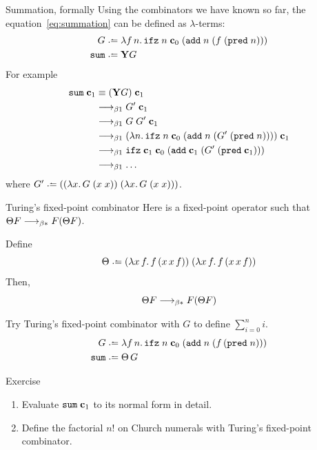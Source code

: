 \begin{frame}{Summation, formally}
  Using the combinators we have known so far, the equation~\eqref{eq:summation}
  can be defined as $\lambda$-terms:
  \begin{align*}
    G \defeq{} & 
    \lambda f\,n.\, \mathtt{ifz}\;n\;\bc_0\;
    (\add\;n\;(f\;(\mathtt{pred}\;n))) \\
    \mathtt{sum} \defeq{} & \mathbf{Y}G
  \end{align*}
  For example
  \begin{align*}
    \mathtt{sum}\;\mathbf{c}_1
      &\equiv  (\mathbf{Y}G)\;\mathbf{c}_1 \\
      &\longrightarrow_{\beta1} G'\;\mathbf{c}_1 \\
      &\longrightarrow_{\beta1} G\;G'\;\mathbf{c}_1 \\
      &\longrightarrow_{\beta1} (\lambda n.\, \mathtt{ifz}\;n\;\mathbf{c}_0\;
      (\mathtt{add}\;n\;(G'\;(\mathtt{pred}\;n))))\;\mathbf{c}_1 \\
      &\longrightarrow_{\beta1} \mathtt{ifz}\;\mathbf{c}_1\;\mathbf{c}_0\;
      (\mathtt{add}\;\mathbf{c}_1\;(G'\;(\mathtt{pred}\;\mathbf{c}_1))) \\
      &\longrightarrow_{\beta1} \dots
  \end{align*}
  where
  $G' \defeq ((\lambda x.\, G\;(x\;x))\;(\lambda x.\,G\;(x\;x)))$.
\end{frame}
  
\begin{frame}{Turing's fixed-point combinator}
Here is a fixed-point operator such that $\Theta F \longrightarrow_{\beta*} F(\Theta F)$.
\begin{proposition}
  Define 
  \[
    \Theta \defeq 
    (\lambda x\,f.\,f\,(x\,x\,f))\;
    (\lambda x\,f.\,f\,(x\,x\,f))
  \]
  Then, 
  \[
    \Theta F \longrightarrow_{\beta*} F (\Theta F)
  \]
\end{proposition}
Try Turing's fixed-point combinator with $G$ to define $\sum_{i=0}^n i$.
\begin{align*}
  G \defeq{} &
  \lambda f\,n.\,
  \mathtt{ifz}\;n\;\bc_0\;
  (\add\;n\;(f\,(\mathtt{pred}\;n))) \\
  \mathtt{sum} \defeq\; & \Theta\,G 
\end{align*}
\end{frame}

\begin{frame}{Exercise}
  \begin{enumerate}
    \item Evaluate $\mathtt{sum}\;\mathbf{c}_1$ to its normal form in detail.
    \item Define the factorial $n!$ on Church numerals with Turing's fixed-point combinator.
  \end{enumerate}
\end{frame}



